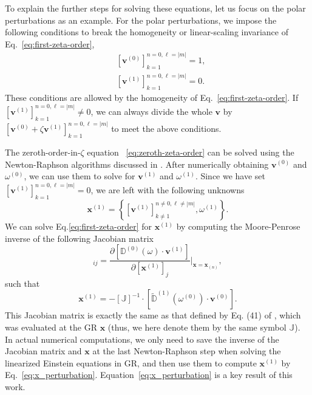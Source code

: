 \documentclass[aps,prx,amsmath,floats,floatfix,twocolumn,
  superscriptaddress,nofootinbib,showpacs]{revtex4-1}
\begin{document}
To explain the further steps for solving these equations, let us focus on the polar perturbations as an example. 
For the polar perturbations, we impose the following conditions to break the homogeneity or linear-scaling invariance of Eq.~\eqref{eq:first-zeta-order}, 
\begin{equation}
\begin{split}
&\left[ \textbf{v}^{(0)}\right]_{k=1}^{n=0,\ell=|m|} = 1, \\
&\left[ \textbf{v}^{(1)}\right]_{k=1}^{n=0,\ell=|m|} = 0. 
\end{split}
\end{equation}
These conditions are allowed by the homogeneity of Eq.~\eqref{eq:first-zeta-order}. 
If $\left[ \textbf{v}^{(1)}\right]_{k=1}^{n=0,\ell=|m|} \neq 0$, we can always divide the whole $\textbf{v}$ by $\left[ \textbf{v}^{(0)} + \zeta \textbf{v}^{(1)} \right]_{k=1}^{n=0,\ell=|m|}$ to meet the above conditions. 

The zeroth-order-in-$\zeta$ equation ~\eqref{eq:zeroth-zeta-order} can be solved using the Newton-Raphson algorithms discussed in \cite{Chung:2023wkd}. 
After numerically obtaining $\textbf{v}^{(0)}$ and $\omega^{(0)}$, we can use them to solve for $\textbf{v}^{(1)}$ and $\omega^{(1)}$. 
Since we have set $\left[ \textbf{v}^{(1)}\right]_{k=1}^{n=0,\ell=|m|} = 0$, we are left with the following unknowns
\begin{equation}
\textbf{x}^{(1)} = \left\{ \left[ \textbf{v}^{(1)}\right]_{k\neq1}^{n\neq0,\ell\neq|m|}, \omega^{(1)}\right\}. 
\end{equation}
We can solve Eq.\eqref{eq:first-zeta-order} for $\textbf{x}^{(1)}$ by computing the Moore-Penrose inverse of the following Jacobian matrix 
\begin{equation}
[\mathbb{J}]_{ij} = \frac{\partial \left[\mathbb{D}^{(0)}(\omega)\cdot \textbf{v}^{(1)} \right]}{\partial [\textbf{x}^{(1)}]_{j}} \Bigg|_{\textbf{x} = \textbf{x}_{(n)}}, 
\end{equation}
such that 
\begin{equation}\label{eq:x_perturbation}
\textbf{x}^{(1)} = - [\mathbb{J}]^{-1} \cdot \left[\tilde{\mathbb{D}}^{(1)} (\omega^{(0)}) \cdot \textbf{v}^{(0)} \right]. 
\end{equation}
This Jacobian matrix is exactly the same as that defined by Eq. (41) of \cite{Chung:2023wkd}, which was evaluated at the GR $\textbf{x}$ (thus, we here denote them by the same symbol $\mathbb{J}$). 
In actual numerical computations, we only need to save the inverse of the Jacobian matrix and $\textbf{x}$ at the last Newton-Raphson step when solving the linearized Einstein equations in GR, and then use them to compute $\textbf{x}^{(1)}$ by Eq.~\eqref{eq:x_perturbation}. 
Equation~\eqref{eq:x_perturbation} is a key result of this work. 
\end{document}
